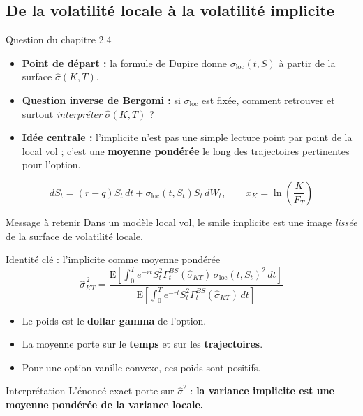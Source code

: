 \subsection{De la volatilité locale à la volatilité implicite}

\begin{frame}{Question du chapitre 2.4}
\small
\begin{itemize}
    \item \textbf{Point de départ :} la formule de Dupire donne \(\sigma_{\mathrm{loc}}(t,S)\) à partir de la surface \(\hat{\sigma}(K,T)\).
    \item \textbf{Question inverse de Bergomi :} si \(\sigma_{\mathrm{loc}}\) est fixée, comment retrouver et surtout \emph{interpréter} \(\hat{\sigma}(K,T)\) ?
    \item \textbf{Idée centrale :} l'implicite n'est pas une simple lecture point par point de la local vol ; c'est une \textbf{moyenne pondérée} le long des trajectoires pertinentes pour l'option.
\end{itemize}

\[
dS_t=(r-q)S_t\,dt+\sigma_{\mathrm{loc}}(t,S_t)S_t\,dW_t,
\qquad
x_K=\ln\!\left(\frac{K}{F_T}\right)
\]

\vspace{0.2cm}
\begin{block}{Message à retenir}
Dans un modèle local vol, le smile implicite est une image \emph{lissée} de la surface de volatilité locale.
\end{block}
\end{frame}

\begin{frame}{Identité clé : l'implicite comme moyenne pondérée}
\small
\[
\hat{\sigma}_{KT}^{\,2}
=
\frac{
\mathrm{E}\!\left[\int_0^T e^{-rt}S_t^2\Gamma_t^{BS}(\hat{\sigma}_{KT})\,
\sigma_{\mathrm{loc}}(t,S_t)^2\,dt\right]
}{
\mathrm{E}\!\left[\int_0^T e^{-rt}S_t^2\Gamma_t^{BS}(\hat{\sigma}_{KT})\,dt\right]
}
\]

\begin{itemize}
    \item Le poids est le \textbf{dollar gamma} de l'option.
    \item La moyenne porte sur le \textbf{temps} et sur les \textbf{trajectoires}.
    \item Pour une option vanille convexe, ces poids sont positifs.
\end{itemize}

\begin{alertblock}{Interprétation}
L'énoncé exact porte sur \(\hat{\sigma}^2\) : \textbf{la variance implicite est une moyenne pondérée de la variance locale.}
\end{alertblock}
\end{frame}

